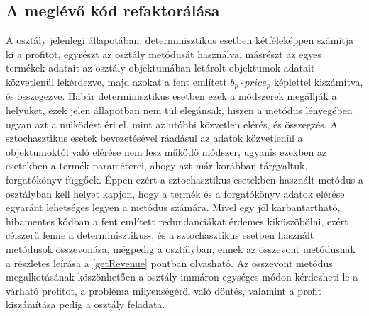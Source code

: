 \subsection{A meglévő kód refaktorálása}
A  osztály jelenlegi állapotában, determinisztikus esetben kétféleképpen számítja ki a profitot, egyrészt az  osztály  metódusát használva, másrészt az egyes termékek adatait az  osztály  objektumában letárolt  objektumok adatait közvetlenül lekérdezve, majd azokat a fent említett $b_p\cdot price_p$ képlettel kiszámítva, és összegezve.
Habár determinisztikus esetben ezek a módszerek megállják a helyüket, ezek jelen állapotban nem túl elegánsak, hiszen a  metódus lényegében ugyan azt a működést éri el, mint az utóbbi közvetlen elérés, és összegzés.
A sztochasztikus esetek bevezetésével ráadásul az adatok közvetlenül a  objektumoktól való elérése nem lesz működő módszer, ugyanis ezekben az esetekben a termék paraméterei, ahogy azt már korábban tárgyaltuk, forgatókönyv függőek.
Éppen ezért a sztochasztikus esetekben használt  metódus a  osztályban kell helyet kapjon, hogy a termék és a forgatókönyv adatok elérése egyaránt lehetséges legyen a metódus számára.
Mivel egy jól karbantartható, hibamentes kódban a fent említett redundanciákat érdemes kiküszöbölni, ezért célszerű lenne a determinisztikus-, és a sztochasztikus esetben használt  metódusok összevonása, mégpedig a  osztályban, ennek az összevont metódusnak a részletes leírása a \ref{getRevenue} pontban olvasható.
Az összevont  metódus megalkotásának köszönhetően a  osztály immáron egységes módon kérdezheti le a várható profitot, a probléma milyenségéről való döntés, valamint a profit kiszámítása pedig a  osztály feladata.

